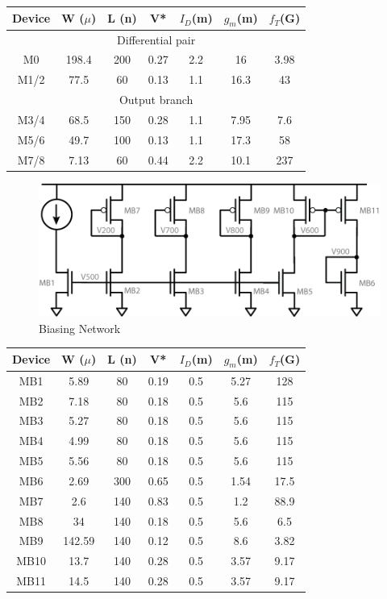 \documentclass[conference]{IEEEtran}
\begin{document}
\begin{center}
\begin{tabular}{|c|c|c|c|c|c|c|} 
\hline
Device & W ($\mu$) & L (n) & V* & $I_D$(m) & $g_m$(m) & $f_T$(G) \\
\hline
\multicolumn{7}{|c|}{Differential pair} \\
\hline
M0 &	 198.4 & 200 & 0.27 & 2.2 & 16 & 3.98 \\
\hline
M1/2 &  77.5 & 60 & 0.13 & 1.1 & 16.3 & 43 \\
\hline
\multicolumn{7}{|c|}{Output branch} \\
\hline
M3/4 & 68.5 & 150 & 0.28 & 1.1 & 7.95 & 7.6 \\
\hline
M5/6 & 49.7 & 100 & 0.13 & 1.1 & 17.3 & 58 \\
\hline
M7/8 & 7.13 & 60 & 0.44 & 2.2 & 10.1 & 237 \\
\hline
\end{tabular}
\end{center}


\begin{figure}[h]
\centering
\includegraphics[width=0.75\linewidth]{illus/bias}
\caption{Biasing Network}
\label{fig:bias}
\end{figure}

\begin{center}
\begin{tabular}{|c|c|c|c|c|c|c|} 
\hline
Device & W ($\mu$) & L (n) & V* & $I_D$(m) & $g_m$(m) & $f_T$(G) \\
\hline
MB1 & 5.89 & 80 & 0.19 & 0.5 & 5.27 & 128 \\
\hline
MB2 & 7.18 & 80 & 0.18 & 0.5 & 5.6 & 115 \\
\hline
MB3 & 5.27 & 80 & 0.18 & 0.5 & 5.6 & 115\\
\hline
MB4 & 4.99 & 80 & 0.18 & 0.5 & 5.6 & 115\\
\hline
MB5 & 5.56 & 80 & 0.18 & 0.5 & 5.6 & 115\\
\hline
MB6 & 2.69 & 300 & 0.65 & 0.5 & 1.54 & 17.5 \\
\hline
MB7 & 2.6 & 140 & 0.83 & 0.5 & 1.2 & 88.9 \\
\hline
MB8 & 34 & 140 & 0.18 & 0.5 & 5.6 & 6.5 \\
\hline
MB9 & 142.59 & 140 & 0.12 & 0.5 & 8.6 & 3.82 \\
\hline
MB10 & 13.7 & 140 & 0.28 & 0.5 & 3.57 & 9.17 \\
\hline
MB11 & 14.5 & 140 & 0.28 & 0.5 & 3.57 & 9.17 \\
\hline
\end{tabular}
\end{center}
\end{document}
